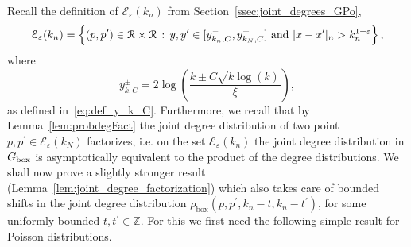 %

Recall the definition of $\mathcal{E}_\varepsilon(k_n)$
from Section~\ref{ssec:joint_degrees_GPo},
\[
	\mathcal{E}_{\varepsilon}(k_n) = \left\{(p,p^\prime) \in {\mathcal R} \times {\mathcal R}
			\, : \, y,y^\prime \in [y_{k_n,C}^-, y_{k_N,C}^+] \text{ and } |x - x^\prime|_n > k_n^{1 + \varepsilon} \right\},
\]
where
\[
	y_{k,C}^\pm = 2 \log\left(\frac{k \pm C \sqrt{k \log(k)}}{\xi}\right),
\]
as defined in~\eqref{eq:def_y_k_C}. Furthermore, we recall that by Lemma~\ref{lem:probdegFact} the joint degree distribution of two point $p, p^\prime \in \mathcal{E}_{\varepsilon}(k_N)$ factorizes, i.e. on the set $\mathcal{E}_\varepsilon(k_n)$ the joint degree distribution in $G_{\mathrm{box}}$ is asymptotically equivalent to the product of the degree distributions. We shall now prove a slightly stronger result (Lemma~\ref{lem:joint_degree_factorization}) which also takes care of bounded shifts in the joint degree distribution $\rho_{\text{box}}(p,p^\prime,k_n - t,k_n - t^\prime)$, for some uniformly bounded $t, t^\prime \in \mathbb{Z}$. For this we first need the following simple result for Poisson distributions.

